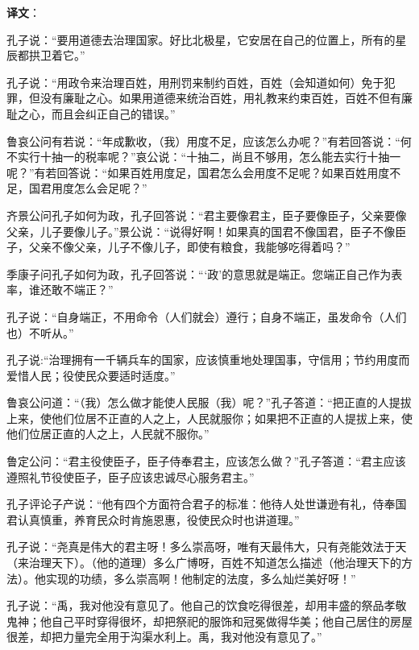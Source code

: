 \documentclass[12pt,UTF-8,openany]{ctexbook}
\begin{document}
\newpage

\textbf{译文}：

\vspace{1em}

\begin{normalsize}
    
    孔子说：“要用道德去治理国家。好比北极星，它安居在自己的位置上，所有的星辰都拱卫着它。”
    
    孔子说：“用政令来治理百姓，用刑罚来制约百姓，百姓（会知道如何）免于犯罪，但没有廉耻之心。如果用道德来统治百姓，用礼教来约束百姓，百姓不但有廉耻之心，而且会纠正自己的错误。”
    
    鲁哀公问有若说：“年成歉收，（我）用度不足，应该怎么办呢？”有若回答说：“何不实行十抽一的税率呢？”哀公说：“十抽二，尚且不够用，怎么能去实行十抽一呢？”有若回答说：“如果百姓用度足，国君怎么会用度不足呢？如果百姓用度不足，国君用度怎么会足呢？”
    
    齐景公问孔子如何为政，孔子回答说：“君主要像君主，臣子要像臣子，父亲要像父亲，儿子要像儿子。”景公说：“说得好啊！如果真的国君不像国君，臣子不像臣子，父亲不像父亲，儿子不像儿子，即使有粮食，我能够吃得着吗？”
    
    季康子问孔子如何为政，孔子回答说：“‘政’的意思就是端正。您端正自己作为表率，谁还敢不端正？”
    
    孔子说：“自身端正，不用命令（人们就会）遵行；自身不端正，虽发命令（人们也）不听从。”
    
    孔子说:“治理拥有一千辆兵车的国家，应该慎重地处理国事，守信用；节约用度而爱惜人民；役使民众要适时适度。”
    
    鲁哀公问道：“（我）怎么做才能使人民服（我）呢？”孔子答道：“把正直的人提拔上来，使他们位居不正直的人之上，人民就服你；如果把不正直的人提拔上来，使他们位居正直的人之上，人民就不服你。”
    
    鲁定公问：“君主役使臣子，臣子侍奉君主，应该怎么做？”孔子答道：“君主应该遵照礼节役使臣子，臣子应该忠诚尽心服务君主。”
    
    孔子评论子产说：“他有四个方面符合君子的标准：他待人处世谦逊有礼，侍奉国君认真慎重，养育民众时肯施恩惠，役使民众时也讲道理。”
    
    孔子说：“尧真是伟大的君主呀！多么崇高呀，唯有天最伟大，只有尧能效法于天（来治理天下）。（他的道理）多么广博呀，百姓不知道怎么描述（他治理天下的方法）。他实现的功绩，多么崇高啊！他制定的法度，多么灿烂美好呀！”
    
    孔子说：“禹，我对他没有意见了。他自己的饮食吃得很差，却用丰盛的祭品孝敬鬼神；他自己平时穿得很坏，却把祭祀的服饰和冠冕做得华美；他自己居住的房屋很差，却把力量完全用于沟渠水利上。禹，我对他没有意见了。”
    
\end{normalsize}
\end{document}
